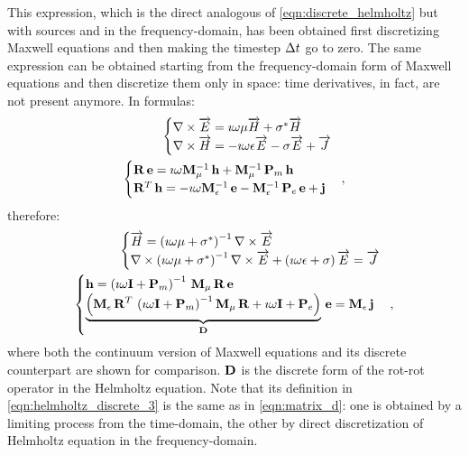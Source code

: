 This expression, which is the direct analogous of
\eqref{eqn:discrete_helmholtz} but with sources and in the
frequency-domain, has been obtained first discretizing Maxwell
equations and then making the timestep $\Delta t$ go to zero. The same
expression can be obtained starting from the frequency-domain form of
Maxwell equations and then discretize them only in
space: time derivatives, in fact, are not present
anymore. In formulas:
\begin{align}
  \begin{cases}
    {\nabla\times \overrightarrow{E}} = \imath \omega \mu \overrightarrow{H} + \sigma^* \overrightarrow{H} \\
    {\nabla \times \overrightarrow{H}} = -\imath \omega \epsilon \overrightarrow{E} - \sigma \overrightarrow{E} + \overrightarrow{J}
  \end{cases} \notag \\
  \begin{cases}
    {\mathbf{R}\,\mathbf{e}} = \imath \omega
    {\mathbf{M}_\mu^{-1}\,\mathbf{h}} +
    {\mathbf{M}_\mu^{-1}\,{\mathbf{P}_m\,\mathbf{h}}} \\
    {{\mathbf{R}}^T\,\mathbf{h}} = -\imath \omega
    {\mathbf{M}_\epsilon^{-1}\,\mathbf{e}} -
    {\mathbf{M}_\epsilon^{-1}\,{\mathbf{P}_e\,\mathbf{e}}} +
    \mathbf{j} 
  \end{cases} , \label{eqn:helmholtz_discrete_2}
\end{align}
therefore:
\begin{align}
  \begin{cases}
    \overrightarrow{H} = \left( \imath \omega \mu + \sigma^* \right)^{-1} {\nabla \times \overrightarrow{E}} \\
    {\nabla \times \left( \imath \omega \mu + \sigma^* \right)^{-1} {\nabla \times \overrightarrow{E}}} +
    \left( \imath \omega \epsilon + \sigma \right) \overrightarrow{E} = \overrightarrow{J}
  \end{cases} \notag \\
  \begin{cases} 
    \mathbf{h} = {{{\left( \imath \omega \mathbf{I} +
    \mathbf{P}_m
    \right)^{-1}\,\mathbf{M}_\mu}\,\mathbf{R}}\,\mathbf{e}} \\
    {\underbrace{\left( {{{{\mathbf{M}_\epsilon\,{\mathbf{R}}^T}\,\left(\imath
    \omega \mathbf{I} + \mathbf{P}_m
    \right)^{-1}}\,\mathbf{M}_\mu}\,\mathbf{R}} +
    \imath \omega \mathbf{I} + \mathbf{P}_e \right)}_{\mathbf{D}}\,\mathbf{e}} =
    {\mathbf{M}_\epsilon\,\mathbf{j}}
  \end{cases} , \label{eqn:helmholtz_discrete_3}
\end{align}
where both the continuum version of Maxwell equations and its discrete
counterpart are shown for comparison. $\mathbf{D}$ is the discrete
form of the rot-rot operator in the Helmholtz equation. Note that its
definition in \eqref{eqn:helmholtz_discrete_3} is the same as in
\eqref{eqn:matrix_d}: one is obtained by a limiting process from the
time-domain, the other by direct discretization of Helmholtz equation
in the frequency-domain.

